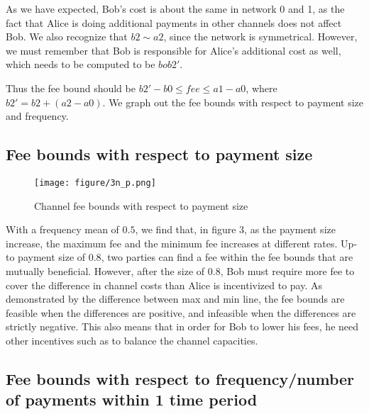 \documentclass[twocolumn,10pt]{report}
\begin{document}
As we have expected, Bob's cost is about the same in network 0 and 1, as the fact that Alice is doing additional payments in other channels does not affect Bob. We also recognize that $b2\sim a2$, since the network is symmetrical. However, we must remember that Bob is responsible for Alice's additional cost as well, which needs to be computed to be $bob2'$. 

Thus the fee bound should be $b2'-b0\leq fee \leq a1-a0$, where $b2'=b2+(a2-a0)$. We graph out the fee bounds with respect to payment size and frequency. 

\subsection{Fee bounds with respect to payment size}
\begin{figure}[t]
    \begin{center}
    \setlength{\unitlength}{0.012500in}%
    \texttt{[image: figure/3n\_p.png]}
    \end{center}
    \caption{Channel fee bounds with respect to payment size}
    \label{figure_3Node3} 
\end{figure}
With a frequency mean of $0.5$, we find that, in figure 3, as the payment size increase, the maximum fee and the minimum fee increases at different rates. Up-to payment size of $0.8$, two parties can find a fee within the fee bounds that are mutually beneficial. However, after the size of $0.8$, Bob must require more fee to cover the difference in channel costs than Alice is incentivized to pay. As demonstrated by the difference between max and min line, the fee bounds are feasible when the differences are positive, and infeasible when the differences are strictly negative. This also means that in order for Bob to lower his fees, he need other incentives such as to balance the channel capacities. 


\subsection{Fee bounds with respect to frequency/number of payments within 1 time period}
\end{document}
